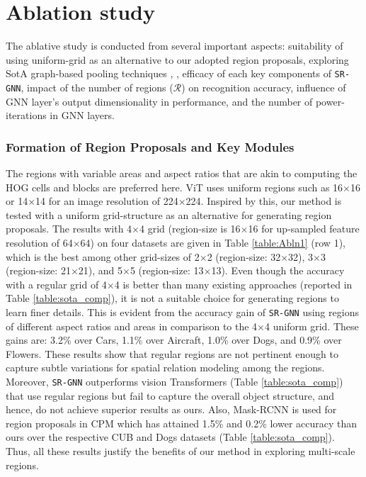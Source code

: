\documentclass[journal]{IEEEtran}
\begin{document}
\section {Ablation study}  \label{Ablation}
The ablative study is conducted from several important aspects: suitability of using uniform-grid as an alternative to our adopted region proposals, exploring SotA graph-based pooling techniques \cite{xu2018powerful}, \cite{zhang2018end}, efficacy of each key components of \texttt{SR-GNN}, impact of the number of regions ($\mathcal{R}$) on recognition accuracy, influence of GNN layer's output dimensionality in performance, and the number of power-iterations in GNN layers. 

\subsubsection{Formation of Region Proposals and Key Modules} 
The regions with variable areas and aspect ratios that are akin to computing the HOG cells and blocks are preferred here. 
ViT uses uniform regions such as  16$\times$16 or 14$\times$14 for an image resolution of 224$\times$224. Inspired by this, our method is tested  with a uniform grid-structure as an alternative for generating region proposals. The results with 4$\times$4 grid (region-size is 16$\times$16 for up-sampled feature resolution of 64$\times$64) on four datasets are given in Table \ref{table:Abln1} (row 1), which is the best among other grid-sizes of 2$\times$2 (region-size: 32$\times$32), 3$\times$3 (region-size: 21$\times$21), and 5$\times$5 (region-size:  13$\times$13). Even though the accuracy with a regular grid of 4$\times$4 is better than many existing approaches (reported in Table \ref{table:sota_comp}), it is not a suitable choice for generating regions to learn finer details. This is evident from the accuracy gain of \texttt{SR-GNN} using regions of different aspect ratios and areas in comparison to the 4$\times$4 uniform grid. These gains are: 3.2\% over Cars, 1.1\% over Aircraft, 1.0\% over Dogs, and 0.9\% over Flowers. These results show that regular regions are not pertinent enough to capture subtle variations for spatial relation modeling among the regions. Moreover, \texttt{SR-GNN} outperforms vision Transformers (Table \ref{table:sota_comp}) that use regular regions but fail to capture the overall object structure, and hence, do not achieve superior results as ours. Also, Mask-RCNN is used for region proposals in CPM \cite{ge2019weakly} which has attained 1.5\% and 0.2\% lower accuracy than ours over the respective CUB and Dogs datasets (Table \ref{table:sota_comp}). Thus, all these results justify the benefits of our method in exploring multi-scale regions. 
\end{document}
